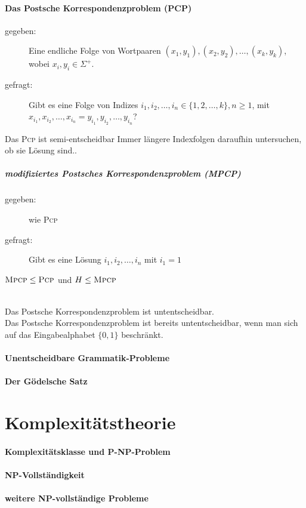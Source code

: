 \documentclass{scrartcl}
\begin{document}
\subsection*{Das Postsche Korrespondenzproblem (PCP)}
\begin{description}
    \item[gegeben:] Eine endliche Folge von Wortpaaren $(x_1,y_1), (x_2,y_2),\dots,(x_k,y_k)$, wobei $x_i,y_i\in\Sigma^+$.
    \item[gefragt:] Gibt es eine Folge von Indizes $i_1,i_2,\dots,i_n\in\{1,2,\dots,k\},n\geq1$, mit $x_{i_1},x_{i_2},\dots,x_{i_n} = y_{i_1},y_{i_2},\dots,y_{i_n}$?
\end{description}
Das \textsc{Pcp} ist semi-entscheidbar {\tiny Immer längere Indexfolgen daraufhin untersuchen, ob sie Lösung sind.}.
\subsubsection*{modifiziertes Postsches Korrespondenzproblem (MPCP)}
\begin{description}
    \item[gegeben:] wie \textsc{Pcp}
    \item[gefragt:] Gibt es eine Lösung $i_1,i_2,\dots,i_n$ mit $i_1=1$
\end{description}

$\textsc{Mpcp} \leq \textsc{Pcp}$ und $H\leq \textsc{Mpcp} $

\begin{shaded}
\ \\
    Das Postsche Korrespondenzproblem ist untentscheidbar.\\[.5cm]
    Das Postsche Korrespondenzproblem ist bereits untentscheidbar, wenn man sich auf das Eingabealphabet $\{0,1\}$ beschränkt.
\end{shaded}

\subsection*{Unentscheidbare Grammatik-Probleme}
\subsection*{Der Gödelsche Satz}

\part*{Komplexitätstheorie}
\subsection*{Komplexitätsklasse und P-NP-Problem}
\subsection*{NP-Vollständigkeit}
\subsection*{weitere NP-vollständige Probleme}
\end{document}
